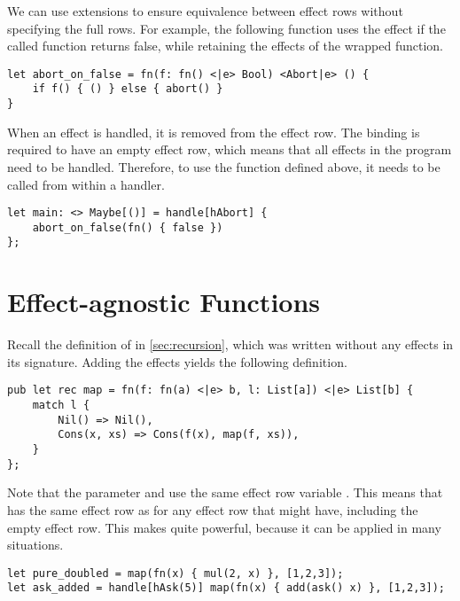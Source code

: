 We can use extensions to ensure equivalence between effect rows without specifying the full rows. For example, the following function uses the  effect if the called function returns false, while retaining the effects of the wrapped function.

\begin{lstlisting}[language=elaine, style=fancy]
let abort_on_false = fn(f: fn() <|e> Bool) <Abort|e> () {
    if f() { () } else { abort() }
}
\end{lstlisting}

When an effect is handled, it is removed from the effect row. The  binding is required to have an empty effect row, which means that all effects in the program need to be handled. Therefore, to use the  function defined above, it needs to be called from within a handler.

\begin{lstlisting}[language=elaine,style=fancy]
let main: <> Maybe[()] = handle[hAbort] {
    abort_on_false(fn() { false })
};
\end{lstlisting}

\section{Effect-agnostic Functions}

Recall the definition of  in \cref{sec:recursion}, which was written without any effects in its signature. Adding the effects yields the following definition.

\begin{lstlisting}[language=elaine,style=fancy]
pub let rec map = fn(f: fn(a) <|e> b, l: List[a]) <|e> List[b] {
    match l {
        Nil() => Nil(),
        Cons(x, xs) => Cons(f(x), map(f, xs)),
    }
};
\end{lstlisting}

Note that the parameter  and  use the same effect row variable . This means that  has the same effect row as  for any effect row that  might have, including the empty effect row. This makes  quite powerful, because it can be applied in many situations.

\begin{lstlisting}[language=elaine,style=fancy]
let pure_doubled = map(fn(x) { mul(2, x) }, [1,2,3]);
let ask_added = handle[hAsk(5)] map(fn(x) { add(ask() x) }, [1,2,3]);
\end{lstlisting}

